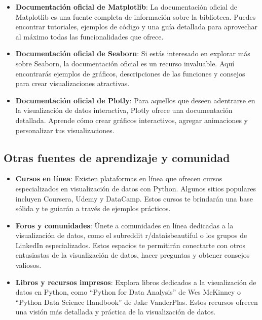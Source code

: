 \documentclass[
  a4paper,
]{article}
\begin{document}
\begin{itemize}
\item
  \textbf{Documentación oficial de Matplotlib}: La documentación oficial
  de Matplotlib es una fuente completa de información sobre la
  biblioteca. Puedes encontrar tutoriales, ejemplos de código y una guía
  detallada para aprovechar al máximo todas las funcionalidades que
  ofrece.
\item
  \textbf{Documentación oficial de Seaborn}: Si estás interesado en
  explorar más sobre Seaborn, la documentación oficial es un recurso
  invaluable. Aquí encontrarás ejemplos de gráficos, descripciones de
  las funciones y consejos para crear visualizaciones atractivas.
\item
  \textbf{Documentación oficial de Plotly}: Para aquellos que deseen
  adentrarse en la visualización de datos interactiva, Plotly ofrece una
  documentación detallada. Aprende cómo crear gráficos interactivos,
  agregar animaciones y personalizar tus visualizaciones.
\end{itemize}

\hypertarget{otras-fuentes-de-aprendizaje-y-comunidad}{%
\subsection{Otras fuentes de aprendizaje y
comunidad}\label{otras-fuentes-de-aprendizaje-y-comunidad}}

\begin{itemize}
\item
  \textbf{Cursos en línea}: Existen plataformas en línea que ofrecen
  cursos especializados en visualización de datos con Python. Algunos
  sitios populares incluyen Coursera, Udemy y DataCamp. Estos cursos te
  brindarán una base sólida y te guiarán a través de ejemplos prácticos.
\item
  \textbf{Foros y comunidades}: Únete a comunidades en línea dedicadas a
  la visualización de datos, como el subreddit r/dataisbeautiful o los
  grupos de LinkedIn especializados. Estos espacios te permitirán
  conectarte con otros entusiastas de la visualización de datos, hacer
  preguntas y obtener consejos valiosos.
\item
  \textbf{Libros y recursos impresos}: Explora libros dedicados a la
  visualización de datos en Python, como ``Python for Data Analysis'' de
  Wes McKinney o ``Python Data Science Handbook'' de Jake VanderPlas.
  Estos recursos ofrecen una visión más detallada y práctica de la
  visualización de datos.
\end{itemize}
\end{document}
